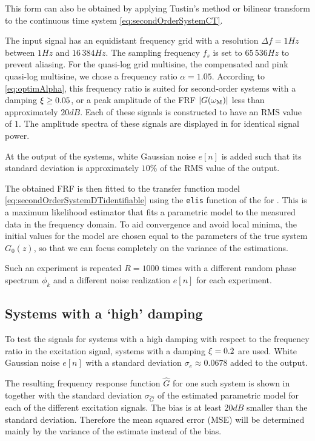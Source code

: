   This form can also be obtained by applying Tustin's method or bilinear transform \citep{Oppenheim1983} to the continuous time system \eqref{eq:secondOrderSystemCT}.

  The input signal has an equidistant frequency grid with a resolution $\Delta f = 1\unit{Hz}$ between $1 \unit{Hz}$ and $16\,384\unit{Hz}$.
  The sampling frequency $f_s$ is set to $65\,536\unit{Hz}$ to prevent aliasing.
  For the quasi-log grid multisine, the compensated and pink quasi-log multisine, we chose a frequency ratio $\alpha = 1.05$.
  According to \eqref{eq:optimAlpha}, this frequency ratio is suited for second-order systems with a damping $\xi \geq 0.05$, or a peak amplitude of the FRF $\left| G(\omega_{\mathrm{M}}) \right|$ less than approximately $20\unit{dB}$.
  Each of these signals is constructed to have an RMS value of $1$.
  The amplitude spectra of these signals are displayed in  for identical signal power.

  At the output of the systems, white Gaussian noise $e[n]$ is added such that its standard deviation is approximately $10\%$ of the RMS value of the output.

  The obtained FRF is then fitted to the transfer function model \eqref{eq:secondOrderSystemDTidentifiable} using the \texttt{elis} function of the \FDIDENT \citep{FDIDENT} for \matlab.
  This is a maximum likelihood estimator that fits a parametric model to the measured data in the frequency domain.
  To aid convergence and avoid local minima, the initial values for the model are chosen equal to the parameters of the true system $G_0(z)$, so that we can focus completely on the variance of the estimations.

  Such an experiment is repeated $R=1000$ times with a different random phase
  spectrum $\phi_k$ and a different noise realization $e[n]$ for each experiment.

  \subsection{Systems with a `high' damping}
  To test the signals for systems with a high damping with respect to the frequency ratio in the excitation signal, systems with a damping $\xi = 0.2$ are used.
  White Gaussian noise $e[n]$ with a standard deviation $\sigma_e \approx 0.0678$ added to the output.

  The resulting frequency response function $\hat{G}$ for one such system is shown in  together with the standard deviation $\sigma_{\hat{G}}$ of the estimated parametric model for each of the different excitation signals.
  The bias is at least $20\unit{dB}$ smaller than the standard  deviation.
  Therefore the mean squared error (MSE) will be determined mainly by the variance of the estimate instead of the bias.


